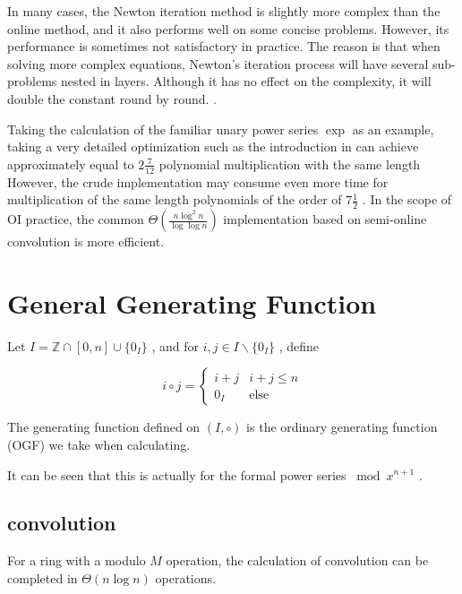 In many cases, the Newton iteration method is slightly more complex than the online method, and it also performs well on some concise problems. However, its performance is sometimes not satisfactory in practice. The reason is that when solving more complex equations, Newton's iteration process will have several sub-problems nested in layers. Although it has no effect on the complexity, it will double the constant round by round. .

Taking the calculation of the familiar unary power series $ \exp $ as an example, taking a very detailed optimization such as the introduction in \cite { newton } can achieve approximately equal to $ 2 \frac  7 {12} $ polynomial multiplication with the same length However, the crude implementation may consume even more time for multiplication of the same length polynomials of the order of $ 7 \frac  12 $ . In the scope of OI practice, the common $ \Theta \left ( \frac {n \log ^2 n}{ \log  \log n} \right ) $ implementation based on semi-online convolution is more efficient.

\section { General Generating Function }

\begin { definition }
Let $ I = \mathbb Z \cap [ 0 , n] \cup  \{ 0 _I \} $ , and for $ i,j \in I \backslash \{ 0 _I \} $ , define

$$
i \circ j = \begin {cases}
i + j & i + j \le n \\
0 _I & \mathrm {else}
\end {cases}
$$

The generating function defined on $ (I, \circ ) $ is the ordinary generating function (OGF) we take when calculating.

\end { definition }

It can be seen that this is actually for the formal power series $ \bmod x^{n+1} $ .

\subsection { convolution }

\begin { theorem }
For a ring with a modulo $ M $ operation, the calculation of convolution can be completed in $ \Theta (n \log n) $ operations.
\end { theorem }

